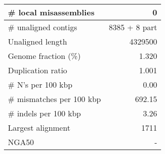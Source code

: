 \documentclass[12pt,a4paper]{article}
\begin{document}
\begin{table}[ht]
\begin{center}
\begin{tabular}{|l*{1}{|r}|}
\# local misassemblies & 0 \\ \hline
\# unaligned contigs & 8385 + 8 part \\ \hline
Unaligned length & 4329500 \\ \hline
Genome fraction (\%) & 1.320 \\ \hline
Duplication ratio & 1.001 \\ \hline
\# N's per 100 kbp & 0.00 \\ \hline
\# mismatches per 100 kbp & 692.15 \\ \hline
\# indels per 100 kbp & 3.26 \\ \hline
Largest alignment & 1711 \\ \hline
NGA50 & - \\ \hline
\end{tabular}
\end{center}
\end{table}
\end{document}
